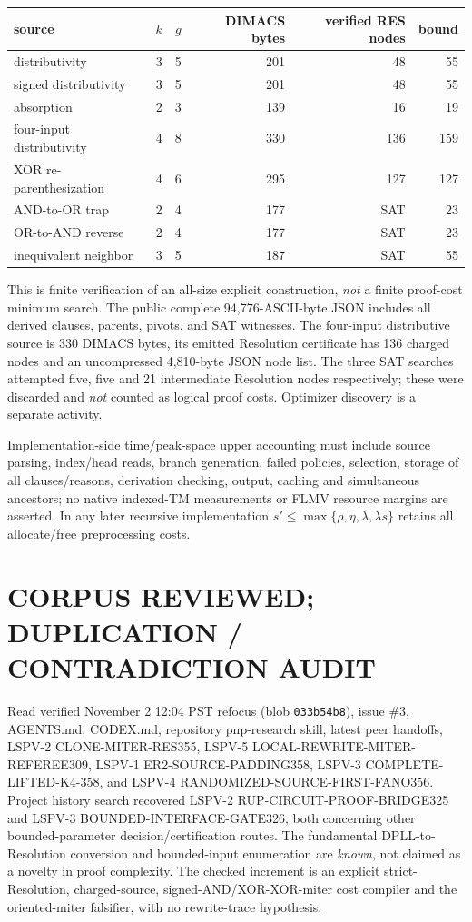 \documentclass[11pt]{article}
\begin{document}
\begin{center}
\begin{tabular}{lrrrrr}\toprule
source & $k$ & $g$ & DIMACS bytes & verified RES nodes & bound\\\midrule
distributivity &3&5&201&48&55\\
signed distributivity &3&5&201&48&55\\
absorption &2&3&139&16&19\\
four-input distributivity &4&8&330&136&159\\
XOR re-parenthesization &4&6&295&127&127\\
AND-to-OR trap &2&4&177& SAT &23\\
OR-to-AND reverse &2&4&177& SAT &23\\
inequivalent neighbor &3&5&187& SAT &55\\\bottomrule
\end{tabular}
\end{center}
This is finite verification of an all-size explicit construction, \emph{not} a finite proof-cost minimum search. The public complete 94,776-ASCII-byte JSON includes all derived clauses, parents, pivots, and SAT witnesses. The four-input distributive source is 330 DIMACS bytes, its emitted Resolution certificate has 136 charged nodes and an uncompressed 4,810-byte JSON node list. The three SAT searches attempted five, five and 21 intermediate Resolution nodes respectively; these were discarded and \emph{not} counted as logical proof costs. Optimizer discovery is a separate activity.

Implementation-side time/peak-space upper accounting must include source parsing, index/head reads, branch generation, failed policies, selection, storage of all clauses/reasons, derivation checking, output, caching and simultaneous ancestors; no native indexed-TM measurements or FLMV resource margins are asserted. In any later recursive implementation $s'\le\max\{\rho,\eta,\lambda,\lambda s\}$ retains all allocate/free preprocessing costs.

\section*{CORPUS REVIEWED; DUPLICATION / CONTRADICTION AUDIT}
Read verified November 2 12:04 PST refocus (blob \texttt{033b54b8}), issue \#3, AGENTS.md, CODEX.md, repository pnp-research skill, latest peer handoffs, LSPV-2 CLONE-MITER-RES355, LSPV-5 LOCAL-REWRITE-MITER-REFEREE309, LSPV-1 ER2-SOURCE-PADDING358, LSPV-3 COMPLETE-LIFTED-K4-358, and LSPV-4 RANDOMIZED-SOURCE-FIRST-FANO356. Project history search recovered LSPV-2 RUP-CIRCUIT-PROOF-BRIDGE325 and LSPV-3 BOUNDED-INTERFACE-GATE326, both concerning other bounded-parameter decision/certification routes. The fundamental DPLL-to-Resolution conversion and bounded-input enumeration are \emph{known}, not claimed as a novelty in proof complexity. The checked increment is an explicit strict-Resolution, charged-source, signed-AND/XOR-XOR-miter cost compiler and the oriented-miter falsifier, with no rewrite-trace hypothesis.
\end{document}
